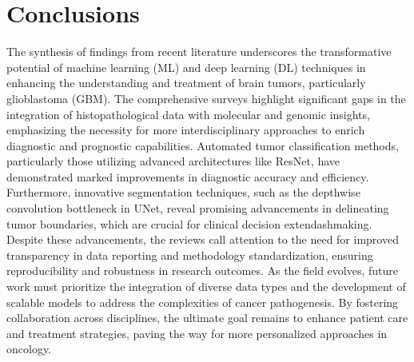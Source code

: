 \documentclass[runningheads]{llncs}
\begin{document}
\section{Conclusions}
The synthesis of findings from recent literature underscores the transformative potential of machine learning (ML) and deep learning (DL) techniques in enhancing the understanding and treatment of brain tumors, particularly glioblastoma (GBM). The comprehensive surveys highlight significant gaps in the integration of histopathological data with molecular and genomic insights, emphasizing the necessity for more interdisciplinary approaches to enrich diagnostic and prognostic capabilities. Automated tumor classification methods, particularly those utilizing advanced architectures like ResNet, have demonstrated marked improvements in diagnostic accuracy and efficiency. Furthermore, innovative segmentation techniques, such as the depthwise convolution bottleneck in UNet, reveal promising advancements in delineating tumor boundaries, which are crucial for clinical decision	extendash{}making. Despite these advancements, the reviews call attention to the need for improved transparency in data reporting and methodology standardization, ensuring reproducibility and robustness in research outcomes. As the field evolves, future work must prioritize the integration of diverse data types and the development of scalable models to address the complexities of cancer pathogenesis. By fostering collaboration across disciplines, the ultimate goal remains to enhance patient care and treatment strategies, paving the way for more personalized approaches in oncology.
\end{document}
